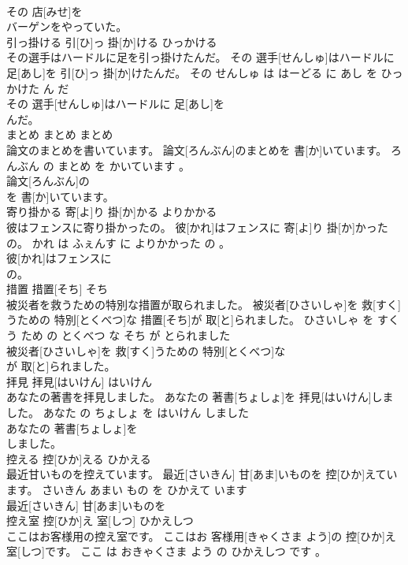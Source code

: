 \documentclass[8pt]{extreport}
\begin{document}
\begin{CJK}{UTF8}{min}
\\	その 店[みせ]を
\\	バーゲンをやっていた。			
\\	引っ掛ける	引[ひ]っ 掛[か]ける	ひっかける	
\\	その選手はハードルに足を引っ掛けたんだ。	その 選手[せんしゅ]はハードルに 足[あし]を 引[ひ]っ 掛[か]けたんだ。	その せんしゅ は はーどる に あし を ひっかけた ん だ	
\\	その 選手[せんしゅ]はハードルに 足[あし]を
\\	んだ。			
\\	まとめ	まとめ	まとめ	
\\	論文のまとめを書いています。	論文[ろんぶん]のまとめを 書[か]いています。	ろんぶん の まとめ を かいています 。	
\\	論文[ろんぶん]の
\\	を 書[か]いています。			
\\	寄り掛かる	寄[よ]り 掛[か]かる	よりかかる	
\\	彼はフェンスに寄り掛かったの。	彼[かれ]はフェンスに 寄[よ]り 掛[か]かったの。	かれ は ふぇんす に よりかかった の 。	
\\	彼[かれ]はフェンスに
\\	の。			
\\	措置	措置[そち]	そち	
\\	被災者を救うための特別な措置が取られました。	被災者[ひさいしゃ]を 救[すく]うための 特別[とくべつ]な 措置[そち]が 取[と]られました。	ひさいしゃ を すくう ため の とくべつ な そち が とられました	
\\	被災者[ひさいしゃ]を 救[すく]うための 特別[とくべつ]な
\\	が 取[と]られました。			
\\	拝見	拝見[はいけん]	はいけん	
\\	あなたの著書を拝見しました。	あなたの 著書[ちょしょ]を 拝見[はいけん]しました。	あなた の ちょしょ を はいけん しました	
\\	あなたの 著書[ちょしょ]を
\\	しました。			
\\	控える	控[ひか]える	ひかえる	
\\	最近甘いものを控えています。	最近[さいきん] 甘[あま]いものを 控[ひか]えています。	さいきん あまい もの を ひかえて います	
\\	最近[さいきん] 甘[あま]いものを
\\	控え室	控[ひか]え 室[しつ]	ひかえしつ	
\\	ここはお客様用の控え室です。	ここはお 客様用[きゃくさま よう]の 控[ひか]え 室[しつ]です。	ここ は おきゃくさま よう の ひかえしつ です 。	

\end{CJK}
\end{document}
